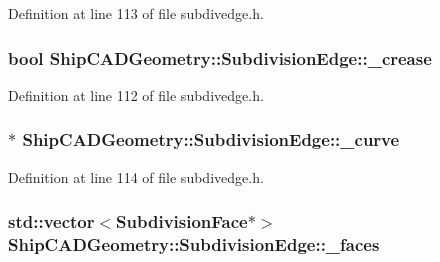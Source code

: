 Definition at line 113 of file subdivedge.\-h.

\hypertarget{classShipCADGeometry_1_1SubdivisionEdge_ae098b2abe43d484178e743a4e0ee2dd1}{
\subsubsection[{\-\_\-crease}]{\setlength{\rightskip}{0pt plus 5cm}bool Ship\-C\-A\-D\-Geometry\-::\-Subdivision\-Edge\-::\-\_\-crease\hspace{0.3cm}{\ttfamily [protected]}}}\label{classShipCADGeometry_1_1SubdivisionEdge_ae098b2abe43d484178e743a4e0ee2dd1}


Definition at line 112 of file subdivedge.\-h.

\hypertarget{classShipCADGeometry_1_1SubdivisionEdge_ae3d4de49a5c6b332d52a6c4e98704183}{
\subsubsection[{\-\_\-curve}]{$\ast$ Ship\-C\-A\-D\-Geometry\-::\-Subdivision\-Edge\-::\-\_\-curve\hspace{0.3cm}{\ttfamily [protected]}}}\label{classShipCADGeometry_1_1SubdivisionEdge_ae3d4de49a5c6b332d52a6c4e98704183}


Definition at line 114 of file subdivedge.\-h.

\hypertarget{classShipCADGeometry_1_1SubdivisionEdge_af74c555a9f1e520c8a7092819182c565}{
\subsubsection[{\-\_\-faces}]{\setlength{\rightskip}{0pt plus 5cm}std\-::vector$<${\bf Subdivision\-Face}$\ast$$>$ Ship\-C\-A\-D\-Geometry\-::\-Subdivision\-Edge\-::\-\_\-faces\hspace{0.3cm}{\ttfamily [protected]}}}\label{classShipCADGeometry_1_1SubdivisionEdge_af74c555a9f1e520c8a7092819182c565}


